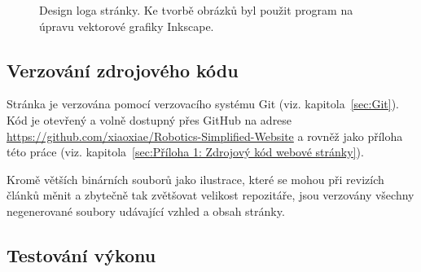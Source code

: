 \documentclass[a4paper, 12pt, twoside]{article}
\begin{document}
  \begin{figure}[H]%
    \centering

    \hfill
    \hfill

    \caption[Design loga stránky]{Design loga stránky. Ke tvorbě obrázků byl použit program na úpravu vektorové grafiky Inkscape.}%
    \label{img:Design loga stránky}%
  \end{figure}



  \subsection{Verzování zdrojového kódu}
  Stránka je verzována pomocí verzovacího systému Git (viz. kapitola~\ref{sec:Git}). Kód je otevřený a volně dostupný přes GitHub na adrese \url{https://github.com/xiaoxiae/Robotics-Simplified-Website} a rovněž jako příloha této práce (viz. kapitola~\ref{sec:Příloha 1: Zdrojový kód webové stránky}).

  Kromě větších binárních souborů jako ilustrace, které se mohou při revizích článků měnit a zbytečně tak zvětšovat velikost repozitáře, jsou verzovány všechny negenerované soubory udávající vzhled a obsah stránky.


  \subsection{Testování výkonu}
\end{document}
